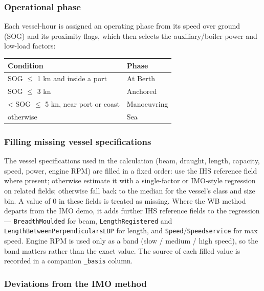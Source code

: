 \documentclass[
  11pt,
]{article}
\begin{document}
\subsubsection{Operational phase}\label{operational-phase}

Each vessel-hour is assigned an operating phase from its speed over
ground (SOG) and its proximity flags, which then selects the
auxiliary/boiler power and low-load factors:

\begin{longtable}[]{@{}
  >{\raggedright\arraybackslash}p{}
  >{\raggedright\arraybackslash}p{}@{}}
\toprule
\textbf{Condition} & \textbf{Phase} \\
\midrule
\endhead
SOG $\leq$ 1 kn and inside a port & At Berth \\
SOG $\leq$ 3 kn & Anchored \\
3 \textless{} SOG $\leq$ 5 kn, near port or coast & Manoeuvring \\
otherwise & Sea \\
\bottomrule
\end{longtable}

\subsubsection{Filling missing vessel
specifications}\label{filling-missing-specs}

The vessel specifications used in the calculation (beam, draught, length,
capacity, speed, power, engine RPM) are filled in a fixed order: use the
IHS reference field where present; otherwise estimate it with a
single-factor or IMO-style regression on related fields; otherwise fall
back to the median for the vessel's class and size bin. A value of 0 in
these fields is treated as missing. Where the WB method departs from the
IMO demo, it adds further IHS reference fields to the regression ---
\texttt{BreadthMoulded} for beam, \texttt{LengthRegistered} and
\texttt{LengthBetweenPerpendicularsLBP} for length, and
\texttt{Speed}/\texttt{Speedservice} for max speed. Engine RPM is used
only as a band (slow / medium / high speed), so the band matters rather
than the exact value. The source of each filled value is recorded in a
companion \texttt{\_basis} column.

\subsubsection{Deviations from the IMO
method}\label{imo-deviations}
\end{document}
